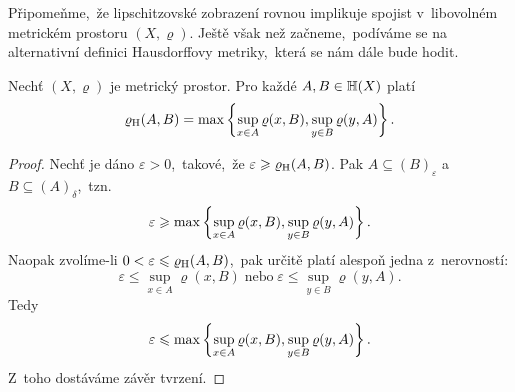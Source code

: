 Připomeňme,~že lipschitzovské zobrazení rovnou implikuje spojist v~libovolném metrickém prostoru $(X,\varrho)$. Ještě však než začneme,~podíváme se na alternativní definici Hausdorffovy metriky,~která se nám dále bude hodit.
\begin{theorem}\label{thm:alternativni-hausdorffova-metrika}
    Nechť $(X,\varrho)$ je metrický prostor. Pro každé $A,B\in\mathbb{H}(X)$ platí
    \[\varrho_\textup{H}(A,B)=\max\left\{\sup_{x\in A}\varrho(x,B),\sup_{y\in B}\varrho(y,A)\right\}.\]
\end{theorem}
\begin{proof}
    Nechť je dáno $\varepsilon>0$,~takové,~že $\varepsilon\geqslant\varrho_\textup{H}(A,B)$. Pak $A\subseteq(B)_\varepsilon$ a~$B\subseteq(A)_\delta$,~tzn.
    \[\varepsilon\geqslant\max\left\{\sup_{x\in A}\varrho(x,B),\sup_{y\in B}\varrho(y,A)\right\}.\]
    Naopak zvolíme-li $0<\varepsilon\leqslant\varrho_\textup{H}(A,B)$,~pak určitě platí alespoň jedna z~nerovností:
    \[\varepsilon\leqslant\sup_{x\in A}\varrho(x,B)\;\text{nebo}\;\varepsilon\leqslant\sup_{y\in B}\varrho(y,A).\]
    Tedy
    \[\varepsilon\leqslant\max\left\{\sup_{x\in A}\varrho(x,B),\sup_{y\in B}\varrho(y,A)\right\}.\]
    Z~toho dostáváme závěr tvrzení.
\end{proof}

